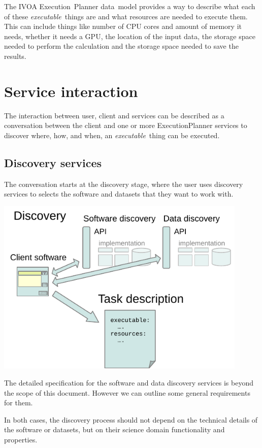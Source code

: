 \documentclass[11pt,a4paper]{ivoa}
\newcommand{\datamodel} {data~model}
\newcommand{\ivoa} {IVOA}
\newcommand{\execplanner} {ExecutionPlanner}
\newcommand{\executionplanner} {Execution~Planner}
\newcommand{\dataset} {dataset}
\newcommand{\executablething} {\textit{executable}~thing}
\newcommand{\cpu} {CPU}
\newcommand{\gpu} {GPU}
\begin{document}
The \ivoa{} \executionplanner{} \datamodel{} provides a way to describe what each of these \executablething{}s
are and what resources are needed to execute them.
This can include things like number of \cpu{} cores and amount of memory it needs,
whether it needs a \gpu{}, the location of the input data, the storage space needed to perform
the calculation and the storage space needed to save the results.

\section{Service interaction}
\label{service-interaction}

The interaction between user, client and services can be described as a conversation between the client
and one or more \execplanner{} services to discover where, how, and when, an \executablething{} can be
executed.

\subsection{Discovery services}
\label{discovery-services}

The conversation starts at the discovery stage, where the user uses discovery services to
selects the software and \dataset{}s that they want to work with.

\includegraphics[width=0.9\textwidth]{diagrams/data-discovery.pdf}

The detailed specification for the software and data discovery services is beyond the
scope of this document.
However we can outline some general requirements for them.

In both cases, the discovery process should not depend on the technical details
of the software or \dataset{}s, but on their science domain functionality and properties.
\end{document}

